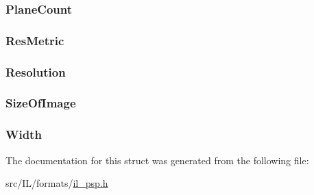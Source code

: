 \hypertarget{struct_g_e_n_a_t_t___c_h_u_n_k_a62638b3d34a4b15120e97bd74c2afa50}{
\subsubsection[{Plane\-Count}]{ Plane\-Count}}\label{struct_g_e_n_a_t_t___c_h_u_n_k_a62638b3d34a4b15120e97bd74c2afa50}
\hypertarget{struct_g_e_n_a_t_t___c_h_u_n_k_a1aa1916368a3073f2c33a9cf6c30f592}{
\subsubsection[{Res\-Metric}]{ Res\-Metric}}\label{struct_g_e_n_a_t_t___c_h_u_n_k_a1aa1916368a3073f2c33a9cf6c30f592}
\hypertarget{struct_g_e_n_a_t_t___c_h_u_n_k_abe979a7bb37fb4a69d9dc0632ac764c6}{
\subsubsection[{Resolution}]{ Resolution}}\label{struct_g_e_n_a_t_t___c_h_u_n_k_abe979a7bb37fb4a69d9dc0632ac764c6}
\hypertarget{struct_g_e_n_a_t_t___c_h_u_n_k_a73a0e02ec00a4862dadf18bee3e09b40}{
\subsubsection[{Size\-Of\-Image}]{ Size\-Of\-Image}}\label{struct_g_e_n_a_t_t___c_h_u_n_k_a73a0e02ec00a4862dadf18bee3e09b40}
\hypertarget{struct_g_e_n_a_t_t___c_h_u_n_k_a0bebc214dbd5f199ad36aefd13feb6e7}{
\subsubsection[{Width}]{ Width}}\label{struct_g_e_n_a_t_t___c_h_u_n_k_a0bebc214dbd5f199ad36aefd13feb6e7}


The documentation for this struct was generated from the following file\-:\begin{DoxyCompactItemize}
\item 
src/\-I\-L/formats/\hyperlink{il__psp_8h}{il\-\_\-psp.\-h}\end{DoxyCompactItemize}
